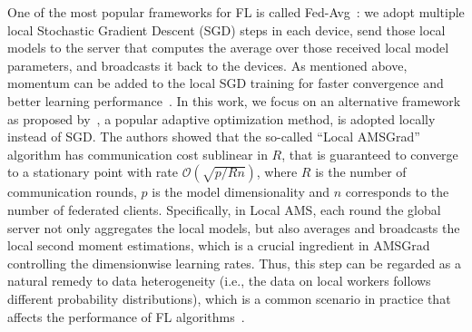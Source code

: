 \documentclass[twoside]{article}
\begin{document}
One of the most popular frameworks for FL is called Fed-Avg~\citep{mcmahan2017communication}: we adopt multiple local Stochastic Gradient Descent (SGD) steps in each device, send those local models to the server that computes the average over those received local model parameters, and broadcasts it back to the devices. As mentioned above, momentum can be added to the local SGD training for faster convergence and better learning performance~\cite{yu2019linear}. In this work, we focus on an alternative framework as proposed by~\citet{chen2020toward}, a popular adaptive optimization method, is adopted locally instead of SGD. The authors showed that the so-called ``Local AMSGrad'' algorithm has communication cost sublinear in $R$, that is guaranteed to converge to a stationary point with rate $\mathcal{O}(\sqrt{p/Rn})$, where $R$ is the number of communication rounds, $p$ is the model dimensionality and $n$ corresponds to the number of federated clients. Specifically, in Local AMS, each round the global server not only aggregates the local models, but also averages and broadcasts the local second moment estimations, which is a crucial ingredient in AMSGrad controlling the dimensionwise learning rates. Thus, this step can be regarded as a natural remedy to data heterogeneity (i.e., the data on local workers follows different probability distributions), which is a common scenario in practice that affects the performance of FL algorithms~\cite{li2019federated,liang2019variance,karimireddy2019scaffold}.


\vspace{0.1in}
\end{document}
